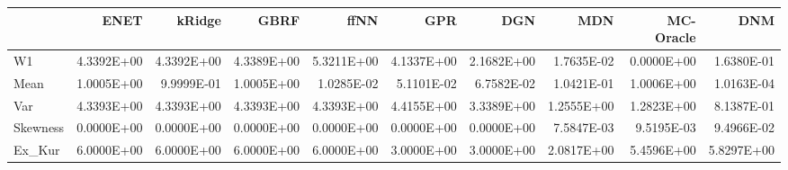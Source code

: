 \begin{tabular}{lrrrrrrrrr}
\toprule
{} &       ENET &     kRidge &       GBRF &       ffNN &        GPR &        DGN &        MDN &  MC-Oracle &        DNM \\
\midrule
W1       & 4.3392E+00 & 4.3392E+00 & 4.3389E+00 & 5.3211E+00 & 4.1337E+00 & 2.1682E+00 & 1.7635E-02 & 0.0000E+00 & 1.6380E-01 \\
Mean     & 1.0005E+00 & 9.9999E-01 & 1.0005E+00 & 1.0285E-02 & 5.1101E-02 & 6.7582E-02 & 1.0421E-01 & 1.0006E+00 & 1.0163E-04 \\
Var      & 4.3393E+00 & 4.3393E+00 & 4.3393E+00 & 4.3393E+00 & 4.4155E+00 & 3.3389E+00 & 1.2555E+00 & 1.2823E+00 & 8.1387E-01 \\
Skewness & 0.0000E+00 & 0.0000E+00 & 0.0000E+00 & 0.0000E+00 & 0.0000E+00 & 0.0000E+00 & 7.5847E-03 & 9.5195E-03 & 9.4966E-02 \\
Ex\_Kur   & 6.0000E+00 & 6.0000E+00 & 6.0000E+00 & 6.0000E+00 & 3.0000E+00 & 3.0000E+00 & 2.0817E+00 & 5.4596E+00 & 5.8297E+00 \\
\bottomrule
\end{tabular}
